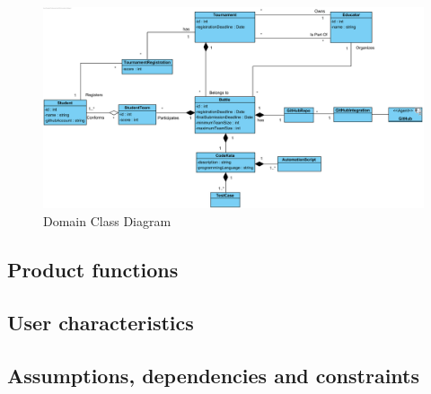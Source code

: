 \documentclass{article}
\begin{document}
\newpage
\begin{figure}[h]
    \centering
    \includegraphics[width=1\textwidth]{images/DomainClassDiagram.png}
    \caption{Domain Class Diagram}
    \label{fig:DomainClassDiagram}
\end{figure}
\newpage



\subsection{Product functions}
\subsection{User characteristics}
\subsection{Assumptions, dependencies and constraints}
\end{document}
